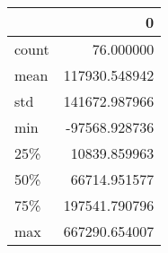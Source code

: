 \begin{tabular}{lr}
\toprule
{} &              0 \\
\midrule
count &      76.000000 \\
mean  &  117930.548942 \\
std   &  141672.987966 \\
min   &  -97568.928736 \\
25\%   &   10839.859963 \\
50\%   &   66714.951577 \\
75\%   &  197541.790796 \\
max   &  667290.654007 \\
\bottomrule
\end{tabular}
